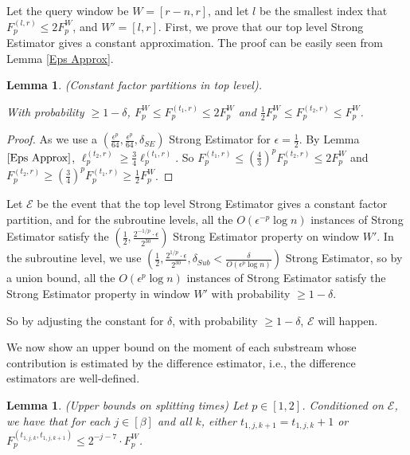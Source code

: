 \documentclass{article}
\newcommand{\est}{\textsf{Strong Estimator }}
\newcommand{\estt}{\textsf{Strong Estimator}}
\theoremstyle{plain}
\newtheorem{lem}[theorem]{Lemma}
\begin{document}
Let the query window be $W=[r-n,r]$, and let $l$ be the smallest index that $F_p ^ {(l,r)} \le 2 F_p ^ W$, and $W'=[l,r]$. First, we prove that our top level \est gives a constant approximation. The proof can be easily seen from Lemma \ref{Eps Approx}. 

\begin{lem}\label{A.1}
 (Constant factor partitions in top level). 

With probability $\ge 1 - \delta$, $F_p ^ W \leq F_p ^ {\left(t_1, r\right)} \leq 2 F_p ^ W$ and $\frac{1}{2} F_p ^ W \leq F_p ^ {\left(t_{2}, r\right)} \leq F_p ^ W$.

\end{lem}

\begin{proof}

As we use a $(\frac {\epsilon ^ p}{64}, \frac {\epsilon ^ p}{64}, \delta_{SE})$ \est for $\epsilon = \frac 12$. By Lemma $\ref{Eps Approx}$, $\ell_p ^ {(t_2, r)} \ge \frac 34 \ell_p ^ {(t_1,r)}$. So $F_p ^ {(t_1, r)} \le (\frac 43) ^ p F_p ^ {(t_2, r)} \le 2 F_p ^ {W}$ and $F_p ^ {(t_2, r)} \ge (\frac 34) ^ p F_p ^ {(t_1, r)} \ge \frac 12 F_p ^ W$.
\end{proof}


Let $\mathcal{E}$ be the event that the top level \est gives a constant factor partition, and for the subroutine levels, all the $O(\epsilon ^ {-p} \log n)$ instances of \est satisfy the $(\frac 12, \frac {2 ^ {-1/p}\cdot \epsilon}{2 ^ {30}})$ \est property on window $W'$. In the subroutine level, we use $(\frac 12, \frac {2 ^ {1/p} \cdot \epsilon}{2 ^ {30}}, \delta_{Sub}< \frac {\delta}{O(\epsilon ^ p \log n)})$ \estt, so by a union bound, all the $O(\epsilon ^ p \log n)$ instances of \est satisfy the \est property in window $W'$ with probability $\ge 1 - \delta$. 

So by adjusting the constant for  $\delta$, with probability $\ge 1 - \delta$, $\mathcal{E}$ will happen.


We now show an upper bound on the moment of each substream whose contribution is estimated by the difference estimator, i.e., the difference estimators are well-defined.


\begin{lem}\label{A.2}(Upper bounds on splitting times)
    Let $p \in[1,2]$. Conditioned on $\mathcal{E}$, we have that for each $j \in[\beta]$ and all $k$, either $t_{1, j, k+1}=t_{1, j, k}+1$ or $F_p ^ {\left(t_{1, j, k}, t_{1, j, k+1}\right)} \leq 2^{-j-7} \cdot F_p ^ W$.
\end{lem}
\end{document}
